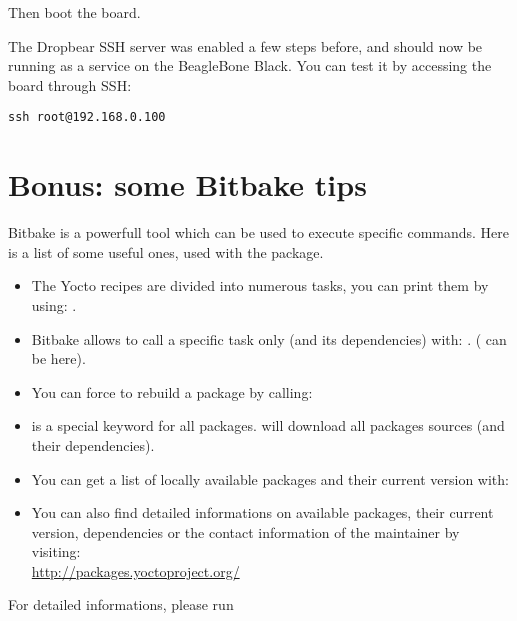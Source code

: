 Then boot the board.

The Dropbear SSH server was enabled a few steps before, and should now be
running as a service on the BeagleBone Black. You can test it by accessing the
board through SSH:
\begin{verbatim}
ssh root@192.168.0.100
\end{verbatim}

\section{Bonus: some Bitbake tips}

Bitbake is a powerfull tool which can be used to execute specific commands. Here
is a list of some useful ones, used with the  package.

\begin{itemize}
  \item The Yocto recipes are divided into numerous tasks, you can print them
        by using: .
  \item Bitbake allows to call a specific task only (and its dependencies)
        with: . ( can be
	 here).
  \item You can force to rebuild a package by calling: 
  \item {} is a special keyword for all packages.  will download all packages sources (and their
        dependencies).
  \item You can get a list of locally available packages and their current
        version with: \\
  \item You can also find detailed informations on available packages, their
        current version, dependencies or the contact information of the
	maintainer by visiting: \\
	\url{http://packages.yoctoproject.org/}
\end{itemize}

For detailed informations, please run 
